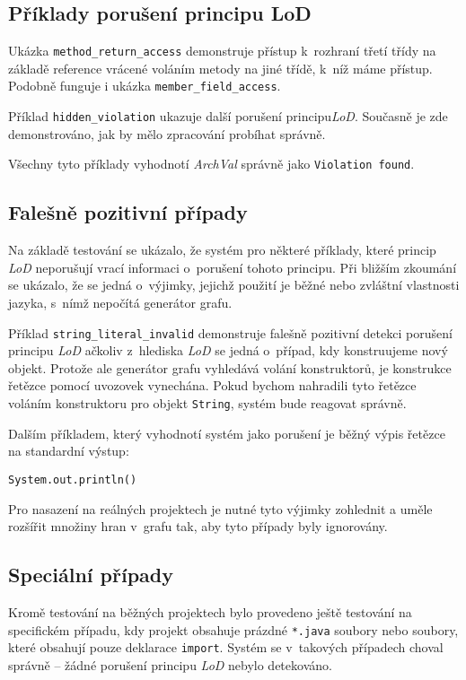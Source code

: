 \subsection{Příklady porušení principu LoD}

Ukázka \verb+method_return_access+ demonstruje přístup k~rozhraní třetí třídy na základě reference vrácené voláním metody na jiné třídě, k~níž máme přístup. Podobně funguje i ukázka \verb+member_field_access+.

Příklad \verb+hidden_violation+ ukazuje další porušení principu\emph{LoD}. Současně je zde demonstrováno, jak by mělo zpracování probíhat správně.

Všechny tyto příklady vyhodnotí \emph{ArchVal} správně jako \verb+Violation found+.

\subsection{Falešně pozitivní případy}

Na základě testování se ukázalo, že systém pro některé příklady, které princip \emph{LoD} neporušují vrací informaci o~porušení tohoto principu. Při bližším zkoumání se ukázalo, že se jedná o~výjimky, jejichž použití je běžné nebo zvláštní vlastnosti jazyka, s~nímž nepočítá generátor grafu.

Příklad \verb+string_literal_invalid+ demonstruje falešně pozitivní detekci porušení principu \emph{LoD} ačkoliv z~hlediska \emph{LoD} se jedná o~případ, kdy konstruujeme nový objekt. Protože ale generátor grafu vyhledává volání konstruktorů, je konstrukce řetězce pomocí uvozovek vynechána. Pokud bychom nahradili tyto řetězce voláním konstruktoru pro objekt \verb+String+, systém bude reagovat správně.

Dalším příkladem, který vyhodnotí systém jako porušení je běžný výpis řetězce na standardní výstup:

\begin{verbatim}
System.out.println()
\end{verbatim}

Pro nasazení na reálných projektech je nutné tyto výjimky zohlednit a uměle rozšířit množiny hran v~grafu tak, aby tyto případy byly ignorovány.

\subsection{Speciální případy}

Kromě testování na běžných projektech bylo provedeno ještě testování na specifickém případu, kdy projekt obsahuje prázdné \verb+*.java+ soubory nebo soubory, které obsahují pouze deklarace \verb+import+. Systém se v~takových případech choval správně -- žádné porušení principu \emph{LoD} nebylo detekováno.
